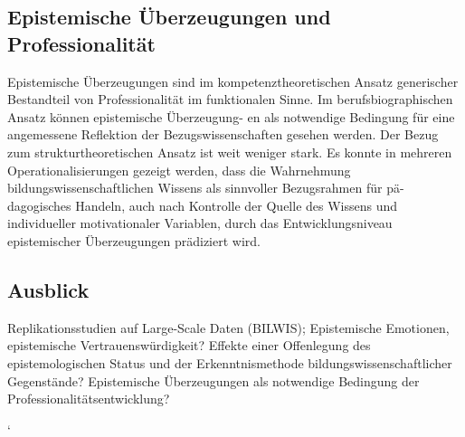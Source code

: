 \documentclass[]{tufte-handout}
\begin{document}
\subsection{Epistemische Überzeugungen und
Professionalität}\label{epistemische-uberzeugungen-und-professionalitat}

Epistemische Überzeugungen sind im kompetenztheoretischen Ansatz
generischer Bestandteil von Professionalität im funktionalen Sinne. Im
berufsbiographischen Ansatz können epistemische Überzeugung- en als
notwendige Bedingung für eine angemessene Reflektion der
Bezugswissenschaften gesehen werden. Der Bezug zum strukturtheoretischen
Ansatz ist weit weniger stark. Es konnte in mehreren
Operationalisierungen gezeigt werden, dass die Wahrnehmung
bildungswissenschaftlichen Wissens als sinnvoller Bezugsrahmen für
pä- dagogisches Handeln, auch nach Kontrolle der Quelle des Wissens und
individueller motivationaler Variablen, durch das Entwicklungsniveau
epistemischer Überzeugungen prädiziert wird.

\subsection{Ausblick}\label{ausblick}

Replikationsstudien auf Large-Scale Daten (BILWIS); Epistemische Emotionen, 
epistemische Vertrauenswürdigkeit? Effekte einer
Offenlegung des epistemologischen Status und der Erkenntnismethode
bildungswissenschaftlicher Gegenstände? Epistemische Überzeugungen als
notwendige Bedingung der Professionalitätsentwicklung?

`


\end{document}
